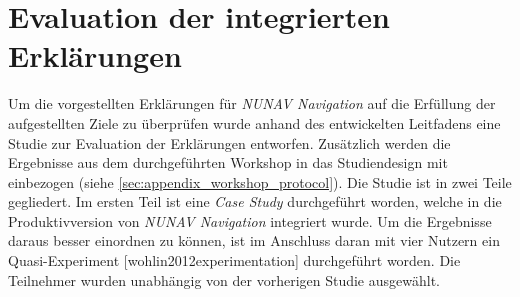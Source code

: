 \section{Evaluation der integrierten Erklärungen}
\label{sec:02_evaluation_explanations}

Um die vorgestellten Erklärungen für \textit{NUNAV Navigation} auf die Erfüllung der aufgestellten Ziele zu überprüfen wurde anhand des entwickelten Leitfadens eine Studie zur Evaluation der Erklärungen entworfen. Zusätzlich werden die Ergebnisse aus dem durchgeführten Workshop in das Studiendesign mit einbezogen (siehe \autoref{sec:appendix_workshop_protocol}). Die Studie ist in zwei Teile gegliedert. Im ersten Teil ist eine \textit{Case Study} \cite{wohlin2012experimentation} durchgeführt worden, welche in die Produktivversion von \textit{NUNAV Navigation} integriert wurde. Um die Ergebnisse daraus besser einordnen zu können, ist im Anschluss daran mit vier Nutzern ein Quasi-Experiment [wohlin2012experimentation] durchgeführt worden. Die Teilnehmer wurden unabhängig von der vorherigen Studie ausgewählt.









